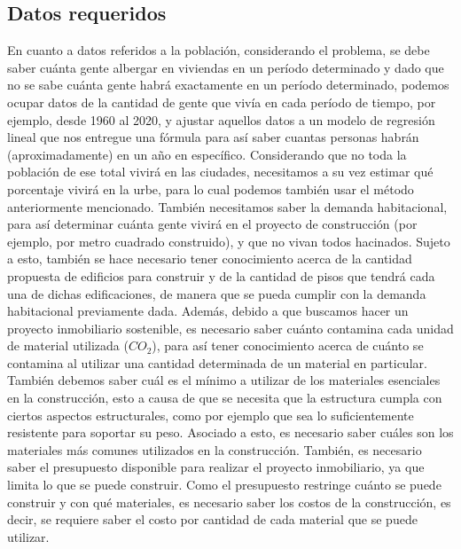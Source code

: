 \documentclass[letterpaper]{article}
\begin{document}
\subsection{Datos requeridos}
En cuanto a datos referidos a la población, considerando el problema, se debe saber cuánta gente albergar en viviendas en un período determinado y dado que no se sabe cuánta gente habrá exactamente en un período determinado, podemos ocupar datos de la cantidad de gente que vivía en cada período de tiempo, por ejemplo, desde 1960 al 2020,
y ajustar aquellos datos a un modelo de regresión lineal que nos entregue una fórmula para así saber cuantas personas habrán (aproximadamente) en un año en específico.
Considerando que no toda la población de ese total vivirá en las ciudades, necesitamos a su vez estimar qué porcentaje vivirá en la urbe, para lo cual podemos
también usar el método anteriormente mencionado. También necesitamos saber la demanda habitacional, para así determinar cuánta gente vivirá
en el proyecto de construcción (por ejemplo, por metro cuadrado construido), y que no vivan todos hacinados. Sujeto a esto, también se hace  necesario tener conocimiento
acerca de la cantidad propuesta de edificios para construir y de la cantidad de pisos que tendrá cada una de dichas edificaciones, de manera que se pueda cumplir con la demanda habitacional previamente dada.
\newline \newline
Además, debido a que buscamos hacer un proyecto inmobiliario sostenible, es necesario saber cuánto contamina cada unidad de material utilizada ($CO_{2}$), para así
tener conocimiento acerca de  cuánto se contamina al utilizar una cantidad determinada de un material en particular. También debemos saber cuál es el mínimo a utilizar de los materiales esenciales en la construcción,
esto a causa de que se necesita que la estructura cumpla con ciertos aspectos estructurales, como por ejemplo que sea lo suficientemente resistente para soportar su peso.
Asociado a esto, es necesario saber cuáles son los materiales más comunes utilizados en la construcción.  También, es necesario saber el presupuesto disponible para realizar el proyecto inmobiliario,
ya que limita lo que se puede construir. Como el presupuesto restringe cuánto se puede construir y con qué materiales, es necesario saber
los costos de la construcción, es decir, se requiere saber el costo por cantidad de cada material que se puede utilizar.
\end{document}
